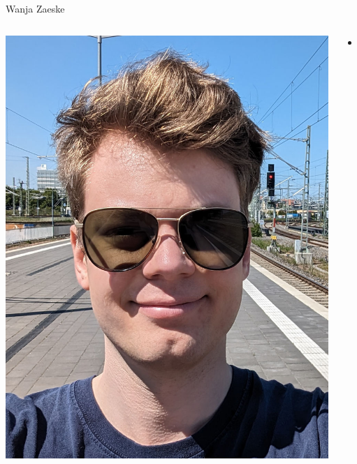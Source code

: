 \begin{frame}{Wanja Zaeske}
  \begin{columns}[fullwidth,c]
    \begin{column}{.3\linewidth}
      \includegraphics[width=.92\linewidth]{graphics/wanja-zaeske.png}
    \end{column}
    \begin{column}{.7\linewidth}
      \begin{itemize}
        \item ...
      \end{itemize}
    \end{column}%
  \end{columns}
\end{frame}

